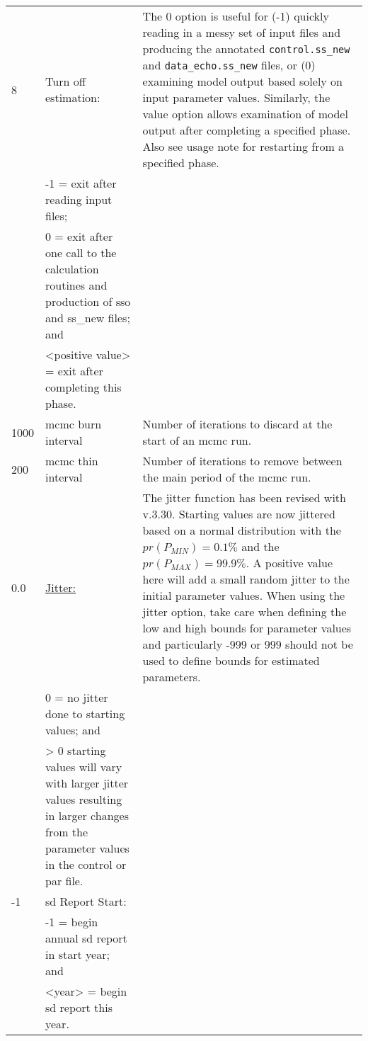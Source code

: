 {\begin{landscape}
\begin{longtable}{p{1.5cm} p{7.2cm} p{12.3cm}}
 \hline
 8 & Turn off estimation: & \multirow{1}{1cm}[-0.25cm]{\parbox{12.5cm}{The 0 option is useful for (-1) quickly reading in a messy set of input files and producing the annotated \texttt{control.ss\_new} and \texttt{data\_echo.ss\_new} files, or (0) examining model output based solely on input parameter values. Similarly, the value option allows examination of model output after completing a specified phase. Also see usage note for restarting from a specified phase.}} \Tstrut\\
   & -1 = exit after reading input files; & \\
   & 0 = exit after one call to the calculation routines and production of sso and ss\_new files; and & \\
   & <positive value> = exit after completing this phase. & \Bstrut\\	  
	     
 \hline
 1000 & \gls{mcmc} burn interval & Number of iterations to discard at the start of an \gls{mcmc} run. \Tstrut\Bstrut\\
	   
 \hline
 200 & \gls{mcmc} thin interval & Number of iterations to remove between the main period of the \gls{mcmc} run. \Tstrut\\
	
 \pagebreak
 0.0 & \hyperlink{Jitter}{Jitter:} & \multirow{1}{1cm}[-0.25cm]{\parbox{12.5cm}{The jitter function has been revised with v.3.30. Starting values are now jittered based on a normal distribution with the $pr(P_{MIN}) = 0.1\%$ and the $pr(P_{MAX}) = 99.9\%$. A positive value here will add a small random jitter to the initial parameter values. When using the jitter option, take care when defining the low and high bounds for parameter values and particularly -999 or 999 should not be used to define bounds for estimated parameters.}} \Tstrut\Bstrut\\ 
	 & 0 = no jitter done to starting values; and & \Bstrut\\
	 & > 0 starting values will vary with larger jitter values resulting in larger changes from the parameter values in the control or par file. & \Bstrut\\
	
 \hline
 -1 & \Gls{sd} Report Start: & \Tstrut\\
    & -1 = begin annual \gls{sd} report in start year; and & \\
    & <year> = begin \gls{sd} report this year. & \Bstrut\\
	      

\end{longtable}
\end{landscape}}
